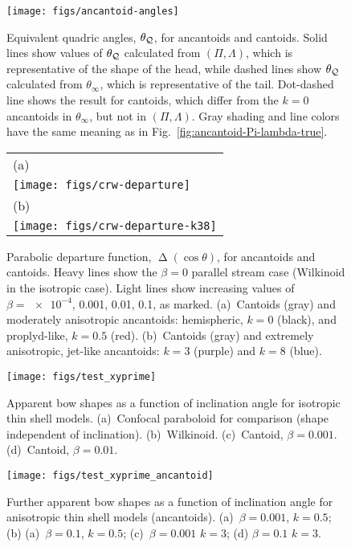 \documentclass[useAMS, usenatbib, a4paper]{mnras}
\DeclareMathOperator{\Depart}{\Delta}
\begin{document}
\begin{figure}
  \centering
  \texttt{[image: figs/ancantoid-angles]}
  \caption[]{Equivalent quadric angles, \(\theta_{\mathcal{Q}}\), for ancantoids and
    cantoids.  Solid lines show values of \(\theta_{\mathcal{Q}}\) calculated from
    \((\Pi, \Lambda)\), which is representative of the shape of the head,
    while dashed lines show \(\theta_{\mathcal{Q}}\) calculated from
    \(\theta_\infty\), which is representative of the tail.  Dot-dashed line
    shows the result for cantoids, which differ from the \(k=0\)
    ancantoids in \(\theta_\infty\), but not in \((\Pi, \Lambda)\). Gray shading and
    line colors have the same meaning as in
    Fig.~\ref{fig:ancantoid-Pi-lambda-true}. }
  \label{fig:ancantoid-angles}
\end{figure}



\begin{figure}
  \centering
  \begin{tabular}{@{}l@{}}
    (a) \\
    \texttt{[image: figs/crw-departure]} \\
    (b) \\
    \texttt{[image: figs/crw-departure-k38]}
  \end{tabular}
  \caption[]{Parabolic departure function, \(\Depart(\cos\theta)\), for
    ancantoids and cantoids.  Heavy lines show the \(\beta = 0\) parallel
    stream case (Wilkinoid in the isotropic case).  Light lines show
    increasing values of \(\beta = \num{e-4}\), \num{0.001}, \num{0.01},
    \num{0.1}, as marked.  (a)~Cantoids (gray) and moderately
    anisotropic ancantoids: hemispheric, \(k = 0\) (black), and
    proplyd-like, \(k = 0.5\) (red). (b)~Cantoids (gray) and extremely
    anisotropic, jet-like ancantoids: \(k = 3\) (purple) and \(k = 8\)
    (blue).}
  \label{fig:ancantoid-departure}
\end{figure}


\begin{figure}
  \centering
  \texttt{[image: figs/test\_xyprime]}
  \caption{Apparent bow shapes as a function of inclination angle for
    isotropic thin shell models. (a)~Confocal paraboloid for
    comparison (shape independent of inclination).
    (b)~Wilkinoid. (c)~Cantoid, \(\beta = 0.001\). (d)~Cantoid,
    \(\beta = 0.01\). }
  \label{fig:xyprime}
\end{figure}

\begin{figure}
  \centering
  \texttt{[image: figs/test\_xyprime\_ancantoid]}
  \caption{Further apparent bow shapes as a function of inclination
    angle for anisotropic thin shell models (ancantoids).
    (a)~\(\beta = 0.001\), \(k = 0.5\); (b) (a)~\(\beta = 0.1\),
    \(k = 0.5\); (c)~\(\beta = 0.001\) \(k = 3\); (d)
    \(\beta = 0.1\) \(k = 3\).}
  \label{fig:xyprime-ancantoid}
\end{figure}
\end{document}
